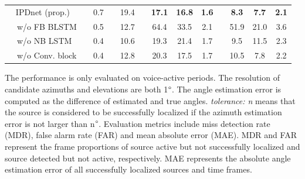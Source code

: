 \documentclass[lettersize,journal]{IEEEtran}
\begin{document}
\begin{table}[]
\begin{tabular}{clcccccccccccc}
\multicolumn{2}{c}{\cellcolor[HTML]{EFEFEF}IPDnet (prop.)} &  & \cellcolor[HTML]{EFEFEF}0.7                                                   &  & \cellcolor[HTML]{EFEFEF}19.4                                               &  & \cellcolor[HTML]{EFEFEF}\textbf{17.1}                  & \cellcolor[HTML]{EFEFEF}\textbf{16.8}                           & \cellcolor[HTML]{EFEFEF}\textbf{1.6}                  &  & \cellcolor[HTML]{EFEFEF}\textbf{8.3}                  & \cellcolor[HTML]{EFEFEF}\textbf{7.7}                   & \cellcolor[HTML]{EFEFEF}\textbf{2.1}                  \\
                        & \qquad w/o FB BLSTM                          &  & 0.5                                                                           &  & 12.7                                                                       &  & 64.4                                                  & 33.5                                                   & 2.1                                                   &  & 51.9                                                   & 21.0                                                   & 3.6                                                   \\
                        & \qquad w/o NB LSTM                           &  & 0.4                                                                           &  & 10.6                                                                       &  & 19.3                                                   & 21.4                                          & 1.7                                          &  & 9.5                                                   & 11.5                                                    & 2.3                                          \\
                        & \qquad w/o Conv. block                       &  & 0.4                                                                           &  & 12.8                                                                       &  & 20.3                                                   & 17.5                                                   & 1.7                                          &  & 10.5                                                   & 7.8                                                    & 2.2 \\ \bottomrule \bottomrule                                         
\end{tabular}
\end{table}
The performance is only evaluated on voice-active periods. The resolution of candidate azimuths and elevations are both 1$\degree$. The angle estimation error is computed as the difference of estimated and true angles. \textit{tolerance: n} means that the source is considered to be successfully localized if the azimuth estimation error is not larger than n$\degree$. Evaluation metrics include miss detection rate (MDR), false alarm rate (FAR) and mean absolute error (MAE). MDR and FAR represent the frame proportions of source active but not successfully localized and source detected but not active, respectively. MAE represents the absolute angle estimation error of all successfully localized sources and time frames. 
\end{document}
